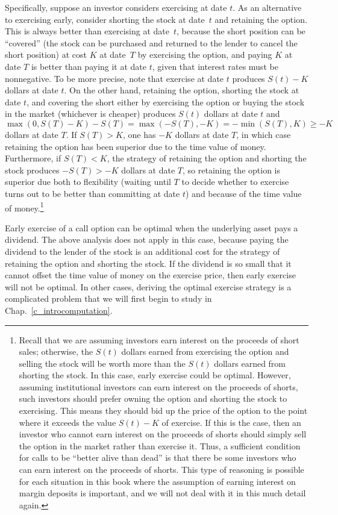 Specifically, suppose an investor considers exercising at date $t$.  As an alternative to exercising early, consider shorting the stock at date~$t$ and retaining the option.  This is always better than exercising at date~$t$, because the short position can  be ``covered'' (the stock can be purchased and returned to the lender to cancel the short position) at cost $K$ at date~$T$ by exercising the option, and paying $K$ at date $T$ is better than paying it at date $t$, given that interest rates must be nonnegative.  To be more precise, note that exercise at date $t$ produces  $S(t)-K$ dollars at date $t$.  On the other hand, retaining the option, shorting the stock at date $t$, and covering the short either by exercising the option or buying the stock in the market (whichever is cheaper) produces $S(t)$ dollars at date $t$ and 
$$\max(0,S(T)-K) - S(T) = \max(-S(T), -K) = -\min(S(T),K) \geq -K$$
dollars at date $T$.  If $S(T)>K$, one has $-K$ dollars at date $T$, in which case retaining the option has been superior due to the time value of money.  Furthermore,  if $S(T)<K$, the strategy of retaining the option and shorting the stock produces $-S(T) > -K$ dollars at date $T$, so retaining the option is superior due both to flexibility (waiting until $T$ to decide whether to exercise turns out to be better than committing at date $t$) and because of the time value of money.\footnote{Recall that we are assuming investors earn interest on the proceeds of short sales; otherwise, the $S(t)$ dollars earned from exercising the option and selling the stock will be worth more than the $S(t)$ dollars earned from shorting the stock.  In this case, early exercise could be optimal.  However, assuming institutional investors can earn interest on the proceeds of shorts,  such investors should prefer owning the option and shorting the stock to exercising.  This means  they should bid up the price of the option to the point where it exceeds the value $S(t)-K$ of exercise.  If this is the case, then an investor who cannot earn interest on the proceeds of shorts should simply sell the option in the market rather than exercise it.  Thus, a sufficient condition for calls to be ``better alive than dead'' is that there be some investors who can earn interest on the proceeds of shorts.  This type of reasoning is possible for each situation in this book where the assumption of earning interest on margin deposits is important, and we will not deal with it in this much detail again.}

Early exercise of a call option can be optimal when the underlying asset pays a dividend.  The above analysis does not apply in this case, because paying the dividend to the lender of the stock is an additional cost for the strategy of retaining the option and shorting the stock.  If the dividend is so small that it cannot offset the time value of money on the exercise price, then early exercise will not be optimal.  In other cases, deriving the optimal exercise strategy is a complicated problem that we will first begin to study in Chap.~\ref{c_introcomputation}.

